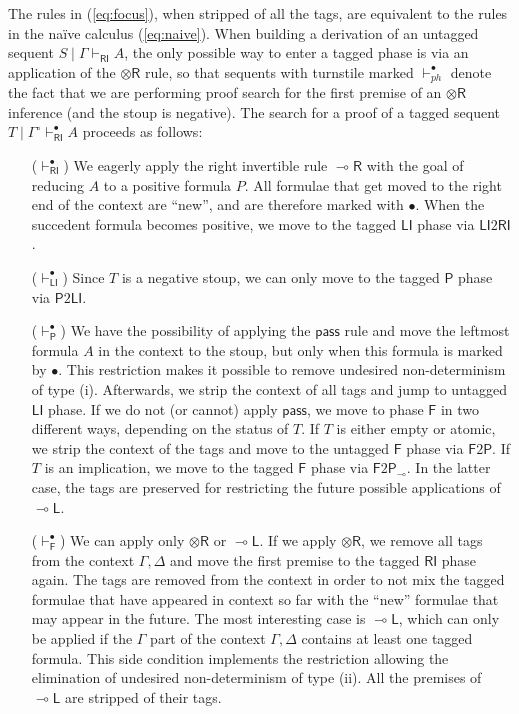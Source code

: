 \documentclass[copyright,creativecommons]{eptcs}
\theoremstyle{definition}
\newcommand{\tl}{\otimes \mathsf{L}}
\newcommand{\tr}{\otimes \mathsf{R}}
\newcommand{\lright}{{\multimap}\mathsf{R}}
\newcommand{\lleft}{{\multimap}\mathsf{L}}
\newcommand{\pass}{\mathsf{pass}}
\newcommand{\unitl}{\mathsf{IL}}
\newcommand{\lolli}{\multimap}
\newcommand{\RI}{\mathsf{RI}}
\newcommand{\LI}{\mathsf{LI}}
\newcommand{\Pass}{\mathsf{P}}
\newcommand{\F}{\mathsf{F}}
\begin{document}
The rules in (\ref{eq:focus}), when stripped of all the tags, are equivalent to the rules in the na{\"i}ve calculus (\ref{eq:naive}). When building a derivation of an untagged sequent $S \mid \Gamma \vdash_\RI A$, the only possible way to enter a tagged phase is via an application of the $\tr$ rule, so that sequents with turnstile marked $\vdash_{ph}^\bullet$ denote the fact that we are performing proof search for the first premise of an $\tr$ inference (and the stoup is negative).
The search for a proof of a tagged sequent $T \mid \Gamma^\circ \vdash^\bullet_\RI A$ proceeds as follows:
\begin{itemize}
\item[($\vdash^\bullet_\RI$)] We eagerly apply the right invertible rule $\lright$ with the goal of reducing $A$ to a positive formula $P$. All formulae that get moved to the right end of the context are ``new'', and are therefore marked with $\bullet$.
  When the succedent formula becomes positive, we move to the tagged $\LI$ phase via $\LI2\RI$.
\item[($\vdash^\bullet_\LI$)] Since $T$ is a negative stoup, we can only move to the tagged $\Pass$ phase via $\Pass2\LI$.
\item[($\vdash^\bullet_\Pass$)] We have the possibility of applying the $\pass$ rule and move the leftmost formula $A$ in the context to the stoup, but only when this formula is marked by $\bullet$. This restriction makes it possible to remove undesired non-determinism of type (i). Afterwards, we strip the context of all tags and jump to untagged $\LI$ phase. If we do not (or cannot) apply $\pass$, we move to phase $\F$  in two different ways, depending on the status of $T$. If $T$ is either empty or atomic, we strip the context of the tags and move to the untagged $\F$ phase via $\F2\Pass$. If $T$ is an implication, we move to the tagged $\F$ phase via $\F2\Pass_\lolli$. In the latter case, the tags are preserved for restricting the future possible applications of $\lleft$.
\item[($\vdash^\bullet_\F$)] We can apply only $\tr$ or $\lleft$. If we apply $\tr$, we remove all tags from the context $\Gamma, \Delta$ and move the first premise to the tagged $\RI$ phase again. The tags are removed from the context in order to not mix the tagged formulae that have appeared in context so far with the ``new'' formulae that may appear in the future. The most interesting case is $\lleft$, which can only be applied if the $\Gamma$ part of the context $\Gamma, \Delta$ contains at least one tagged formula. This side condition implements the restriction allowing the elimination of undesired non-determinism of type (ii). All the premises of $\lleft$ are stripped of their tags.
\end{itemize}
\end{document}
